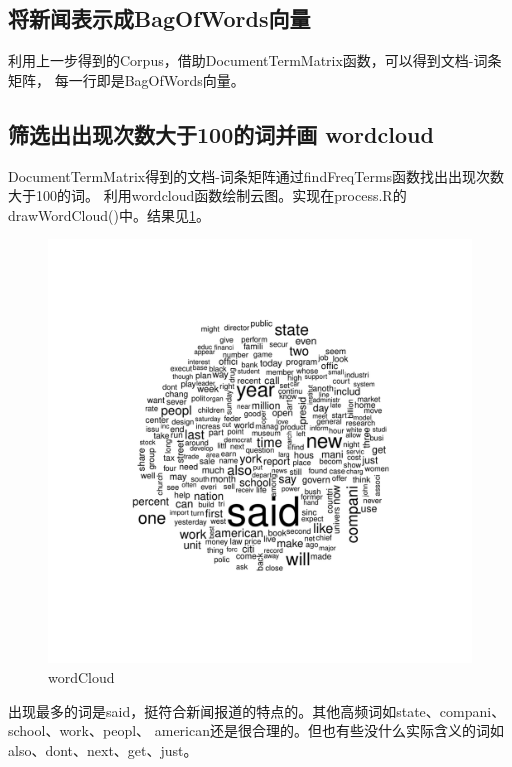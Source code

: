 \documentclass[12pt]{article}
\begin{document}
\subsection{将新闻表示成BagOfWords向量}
利用上一步得到的Corpus，借助DocumentTermMatrix函数，可以得到文档-词条矩阵，
每一行即是BagOfWords向量。
\subsection{筛选出出现次数大于100的词并画 wordcloud}
DocumentTermMatrix得到的文档-词条矩阵通过findFreqTerms函数找出出现次数大于100的词。
利用wordcloud函数绘制云图。实现在process.R的drawWordCloud()中。结果见\ref{fig:wordCloud}。
\begin{figure}[htbp]
\centering
\includegraphics[width=1.0\textwidth]{../result/wordCloud.pdf}
\caption{wordCloud}
\label{fig:wordCloud}
\end{figure}
出现最多的词是said，挺符合新闻报道的特点的。其他高频词如state、compani、school、work、peopl、
american还是很合理的。但也有些没什么实际含义的词如also、dont、next、get、just。
\end{document}
